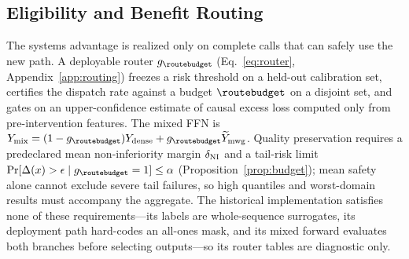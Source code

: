 \subsection{Eligibility and Benefit Routing}
\label{sec:eligibility}

The systems advantage is realized only on complete calls that can safely use
the new path. A deployable router $g_{\routebudget}$ (Eq.~\ref{eq:router},
Appendix~\ref{app:routing}) freezes a risk threshold on a held-out
calibration set, certifies the dispatch rate against a budget $\routebudget$
on a disjoint set, and gates on an upper-confidence estimate of causal excess
loss computed only from pre-intervention features. The mixed FFN is
$Y_{\mathrm{mix}}=(1-g_{\routebudget})Y_{\mathrm{dense}}+g_{\routebudget}\widetilde{Y}_{\mathrm{mwg}}$.
Quality preservation requires a predeclared mean non-inferiority margin
$\delta_{\rm NI}$ and a tail-risk limit
$\Pr[\Delta(x)>\epsilon\mid g_{\routebudget}=1]\le\alpha$
(Proposition~\ref{prop:budget}); mean safety alone cannot exclude severe tail
failures, so high quantiles and worst-domain results must accompany the
aggregate. The historical implementation satisfies none of these
requirements---its labels are whole-sequence surrogates, its deployment path
hard-codes an all-ones mask, and its mixed forward evaluates both branches
before selecting outputs---so its router tables are diagnostic only.
